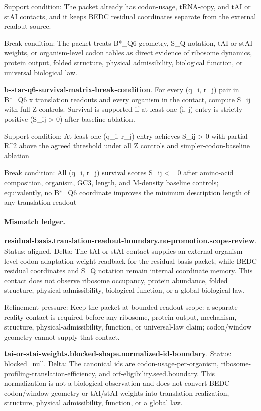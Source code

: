 Support condition: The packet already has codon-usage, tRNA-copy, and tAI or stAI contacts, and it keeps BEDC residual coordinates separate from the external readout source.

Break condition: The packet treats B*\_Q6 geometry, S\_Q notation, tAI or stAI weights, or organism-level codon tables as direct evidence of ribosome dynamics, protein output, folded structure, physical admissibility, biological function, or universal biological law.

\textbf{b-star-q6-survival-matrix-break-condition}. For every (q\_i, r\_j) pair in B*\_Q6 x translation readouts and every organism in the contact, compute S\_ij with full Z controls. Survival is supported if at least one (i, j) entry is strictly positive (S\_ij > 0) after baseline ablation.

Support condition: At least one (q\_i, r\_j) entry achieves S\_ij > 0 with partial R\textasciicircum{}2 above the agreed threshold under all Z controls and simpler-codon-baseline ablation

Break condition: All (q\_i, r\_j) survival scores S\_ij <= 0 after amino-acid composition, organism, GC3, length, and M-density baseline controls; equivalently, no B*\_Q6 coordinate improves the minimum description length of any translation readout

\paragraph{Mismatch ledger.}
\textbf{residual-basis.translation-readout-boundary.no-promotion.scope-review}. Status: aligned. Delta: The tAI or stAI contact supplies an external organism-level codon-adaptation weight readback for the residual-basis packet, while BEDC residual coordinates and S\_Q notation remain internal coordinate memory. This contact does not observe ribosome occupancy, protein abundance, folded structure, physical admissibility, biological function, or a global biological law.

Refinement pressure: Keep the packet at bounded readout scope: a separate reality contact is required before any ribosome, protein-output, mechanism, structure, physical-admissibility, function, or universal-law claim; codon/window geometry cannot supply that contact.

\textbf{tai-or-stai-weights.blocked-shape.normalized-id-boundary}. Status: blocked\_null. Delta: The canonical ids are codon-usage-per-organism, ribosome-profiling-translation-efficiency, and orf-eligibility.seed.boundary. This normalization is not a biological observation and does not convert BEDC codon/window geometry or tAI/stAI weights into translation realization, structure, physical admissibility, function, or a global law.

